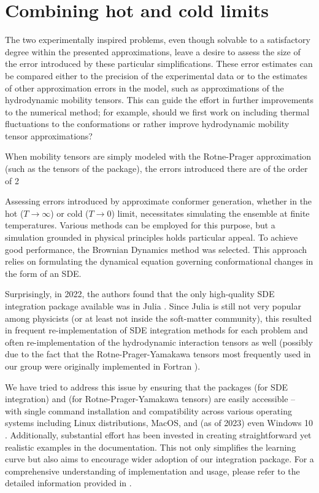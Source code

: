 \documentclass{doctoral}
\newcommand{\code}[1]{\texttt{\detokenize{#1}}}
\begin{document}
\section{Combining hot and cold limits}

\label{sec:combining_hot_and_cold_approaches}
The two experimentally inspired problems, even though solvable to a satisfactory degree within the presented approximations, leave a desire to assess the size of the error introduced by these particular simplifications.
These error estimates can be compared either to the precision of the experimental data or to the estimates of other approximation errors in the model, such as approximations of the hydrodynamic mobility tensors.
This can guide the effort in further improvements to the numerical method; for example, should we first work on including thermal fluctuations to the conformations or rather improve hydrodynamic mobility tensor approximations?

When mobility tensors are simply modeled with the Rotne-Prager approximation (such as the tensors of the \code{pygrpy} package), the errors introduced there are of the order of 2 

Assessing errors introduced by approximate conformer generation, whether in the hot ($T\to\infty$) or cold ($T\to0$) limit, necessitates simulating the ensemble at finite temperatures.
Various methods can be employed for this purpose, but a simulation grounded in physical principles holds particular appeal.
To achieve good performance, the Brownian Dynamics method was selected.
This approach relies on formulating the dynamical equation governing conformational changes in the form of an SDE.

Surprisingly, in 2022, the authors found that the only high-quality SDE integration package available was \code{differentialequations.jl} in Julia \cite{Rackauckas_2017}.
Since Julia is still not very popular among physicists (or at least not inside the soft-matter community), this resulted in frequent re-implementation of SDE integration methods for each problem and often re-implementation of the hydrodynamic interaction tensors as well (possibly due to the fact that the Rotne-Prager-Yamakawa tensors most frequently used in our group were originally implemented in Fortran \cite{Zuk_2018}).

We have tried to address this issue by ensuring that the packages \code{pychastic} (for SDE integration) and \code{pygrpy} (for Rotne-Prager-Yamakawa tensors) are easily accessible -- with single command installation and compatibility across various operating systems including Linux distributions, MacOS, and (as of 2023) even Windows 10 \cite{jax_on_windows}.
Additionally, substantial effort has been invested in creating straightforward yet realistic examples in the documentation.
This not only simplifies the learning curve but also aims to encourage wider adoption of our integration package.
For a comprehensive understanding of implementation and usage, please refer to the detailed information provided in \textcite{Waszkiewicz_2023_pychastic}.
\end{document}
